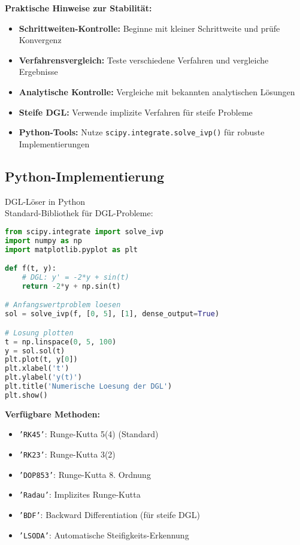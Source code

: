 \begin{remark}
\textbf{Praktische Hinweise zur Stabilität:}
\begin{itemize}
    \item \textbf{Schrittweiten-Kontrolle:} Beginne mit kleiner Schrittweite und prüfe Konvergenz
    \item \textbf{Verfahrensvergleich:} Teste verschiedene Verfahren und vergleiche Ergebnisse
    \item \textbf{Analytische Kontrolle:} Vergleiche mit bekannten analytischen Lösungen
    \item \textbf{Steife DGL:} Verwende implizite Verfahren für steife Probleme
    \item \textbf{Python-Tools:} Nutze \texttt{scipy.integrate.solve\_ivp()} für robuste Implementierungen
\end{itemize}
\end{remark}

\subsection{Python-Implementierung}

\begin{code}{DGL-Löser in Python}\\
Standard-Bibliothek für DGL-Probleme:
\begin{lstlisting}[language=Python, style=basesmol]
from scipy.integrate import solve_ivp
import numpy as np
import matplotlib.pyplot as plt

def f(t, y):
    # DGL: y' = -2*y + sin(t)
    return -2*y + np.sin(t)

# Anfangswertproblem loesen
sol = solve_ivp(f, [0, 5], [1], dense_output=True)

# Losung plotten
t = np.linspace(0, 5, 100)
y = sol.sol(t)
plt.plot(t, y[0])
plt.xlabel('t')
plt.ylabel('y(t)')
plt.title('Numerische Loesung der DGL')
plt.show()
\end{lstlisting}

\textbf{Verfügbare Methoden:}
\begin{itemize}
    \item \texttt{'RK45'}: Runge-Kutta 5(4) (Standard)
    \item \texttt{'RK23'}: Runge-Kutta 3(2)
    \item \texttt{'DOP853'}: Runge-Kutta 8. Ordnung
    \item \texttt{'Radau'}: Implizites Runge-Kutta
    \item \texttt{'BDF'}: Backward Differentiation (für steife DGL)
    \item \texttt{'LSODA'}: Automatische Steifigkeits-Erkennung
\end{itemize}
\end{code}


